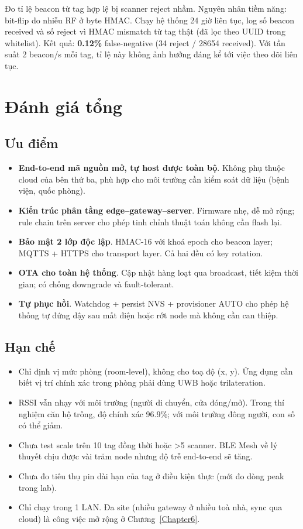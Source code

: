 Đo tỉ lệ beacon từ tag hợp lệ bị scanner reject nhầm. Nguyên nhân tiềm năng: bit-flip do nhiễu RF ở byte HMAC. Chạy hệ thống 24 giờ liên tục, log số beacon received và số reject vì HMAC mismatch từ tag thật (đã lọc theo UUID trong whitelist). Kết quả: \textbf{0.12\%} false-negative (34 reject / 28654 received). Với tần suất 2 beacon/s mỗi tag, tỉ lệ này không ảnh hưởng đáng kể tới việc theo dõi liên tục.

\section{Đánh giá tổng}

\subsection{Ưu điểm}

\begin{itemize}
    \item \textbf{End-to-end mã nguồn mở, tự host được toàn bộ}. Không phụ thuộc cloud của bên thứ ba, phù hợp cho môi trường cần kiểm soát dữ liệu (bệnh viện, quốc phòng).
    \item \textbf{Kiến trúc phân tầng edge–gateway–server}. Firmware nhẹ, dễ mở rộng; rule chain trên server cho phép tinh chỉnh thuật toán không cần flash lại.
    \item \textbf{Bảo mật 2 lớp độc lập}. HMAC-16 với khoá epoch cho beacon layer; MQTTS + HTTPS cho transport layer. Cả hai đều có key rotation.
    \item \textbf{OTA cho toàn hệ thống}. Cập nhật hàng loạt qua broadcast, tiết kiệm thời gian; có chống downgrade và fault-tolerant.
    \item \textbf{Tự phục hồi}. Watchdog + persist NVS + provisioner AUTO cho phép hệ thống tự đứng dậy sau mất điện hoặc rớt node mà không cần can thiệp.
\end{itemize}

\subsection{Hạn chế}

\begin{itemize}
    \item Chỉ định vị mức phòng (room-level), không cho toạ độ (x, y). Ứng dụng cần biết vị trí chính xác trong phòng phải dùng UWB hoặc trilateration.
    \item RSSI vẫn nhạy với môi trường (người di chuyển, cửa đóng/mở). Trong thí nghiệm căn hộ trống, độ chính xác 96.9\%; với môi trường đông người, con số có thể giảm.
    \item Chưa test scale trên 10 tag đồng thời hoặc >5 scanner. BLE Mesh về lý thuyết chịu được vài trăm node nhưng độ trễ end-to-end sẽ tăng.
    \item Chưa đo tiêu thụ pin dài hạn của tag ở điều kiện thực (mới đo dòng peak trong lab).
    \item Chỉ chạy trong 1 LAN. Đa site (nhiều gateway ở nhiều toà nhà, sync qua cloud) là công việc mở rộng ở Chương~\ref{Chapter6}.
\end{itemize}

